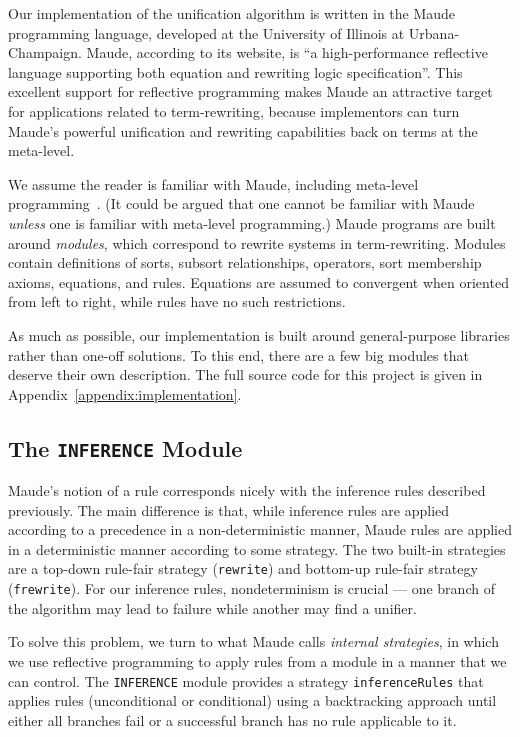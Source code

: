 \documentclass[11pt]{article}
\newcommand{\TitleListing}[1]{\texorpdfstring{\lstinline|#1|}{#1}}
\begin{document}
Our implementation of the unification algorithm is written in the Maude
programming language, developed at the University of Illinois at
Urbana-Champaign. Maude, according to its website, is ``a high-performance
reflective language supporting both equation and rewriting logic
specification''. This excellent support for reflective programming makes Maude
an attractive target for applications related to term-rewriting, because
implementors can turn Maude's powerful unification and rewriting capabilities
back on terms at the meta-level.

We assume the reader is familiar with Maude, including meta-level
programming~\cite{clavel2011maude}. (It could be argued that one cannot be
familiar with Maude \emph{unless} one is familiar with meta-level programming.)
Maude programs are built around \emph{modules}, which correspond to rewrite
systems in term-rewriting. Modules contain definitions of sorts, subsort
relationships, operators, sort membership axioms, equations, and rules.
Equations are assumed to convergent when oriented from left to right, while
rules have no such restrictions.

As much as possible, our implementation is built around general-purpose
libraries rather than one-off solutions. To this end, there are a few big
modules that deserve their own description. The full source code for this
project is given in Appendix~\ref{appendix:implementation}.

\subsection{The \TitleListing{INFERENCE} Module}\label{subsection:inference-mod}

Maude's notion of a rule corresponds nicely with the inference rules described
previously. The main difference is that, while inference rules are applied
according to a precedence in a non-deterministic manner, Maude rules are applied
in a deterministic manner according to some strategy. The two built-in strategies
are a top-down rule-fair strategy (\lstinline|rewrite|) and bottom-up rule-fair
strategy (\lstinline|frewrite|). For our inference rules, nondeterminism is
crucial --- one branch of the algorithm may lead to failure while another may
find a unifier.

To solve this problem, we turn to what Maude calls \emph{internal strategies},
in which we use reflective programming to apply rules from a module in a manner
that we can control. The \lstinline|INFERENCE| module provides a strategy
\lstinline|inferenceRules| that applies rules (unconditional or conditional)
using a backtracking approach until either all branches fail or a successful
branch has no rule applicable to it.
\end{document}
